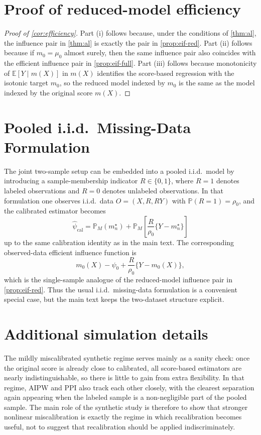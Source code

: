 \documentclass{article}
\theoremstyle{plain}
\theoremstyle{definition}
\newcommand{\E}{\mathbb{E}}
\newcommand{\Prob}{\mathbb{P}}
\newcommand{\1}{\mathbbm{1}}
\newcommand{\psihat}{\widehat{\psi}_{\mathrm{cal}}}
\newcommand{\rhozero}{\rho_0}
\newcommand{\mtilde}{m_n^\star}
\newcommand{\muzero}{\mu_0}
\begin{document}
\section{Proof of reduced-model efficiency}
\label{app:eff}

\begin{proof}[Proof of \cref{cor:efficiency}]
Part (i) follows because, under the conditions of \cref{thm:al}, the influence pair in \cref{thm:al} is exactly the pair in \cref{prop:eif-red}. Part (ii) follows because if \(m_0=\muzero\) almost surely, then the same influence pair also coincides with the efficient influence pair in \cref{prop:eif-full}. Part (iii) follows because monotonicity of \(\E[Y\mid m(X)]\) in \(m(X)\) identifies the score-based regression with the isotonic target \(m_0\), so the reduced model indexed by \(m_0\) is the same as the model indexed by the original score \(m(X)\).
\end{proof}
 

\section{Pooled i.i.d.\ Missing-Data Formulation}
\label{app:iid}

The joint two-sample setup can be embedded into a pooled i.i.d.\ model by introducing a sample-membership indicator \(R \in \{0,1\}\), where \(R=1\) denotes labeled observations and \(R=0\) denotes unlabeled observations. In that formulation one observes i.i.d.\ data \(O=(X,R,RY)\) with \(\Prob(R=1)=\rhozero\), and the calibrated estimator becomes
\[
\psihat = \mathbb P_M(\mtilde) + \mathbb P_M\left[\frac{R}{\rhozero}\{Y-\mtilde\}\right]
\]
up to the same calibration identity as in the main text. The corresponding observed-data efficient influence function is
\[
m_0(X)-\psi_0+\frac{R}{\rhozero}\{Y-m_0(X)\},
\]
which is the single-sample analogue of the reduced-model influence pair in \cref{prop:eif-red}. Thus the usual i.i.d.\ missing-data formulation is a convenient special case, but the main text keeps the two-dataset structure explicit.

 

\section{Additional simulation details}
\label{app:simulation-extra}
The mildly miscalibrated synthetic regime serves mainly as a sanity check: once the original score is already close to calibrated, all score-based estimators are nearly indistinguishable, so there is little to gain from extra flexibility. In that regime, AIPW and PPI also track each other closely, with the clearest separation again appearing when the labeled sample is a non-negligible part of the pooled sample. The main role of the synthetic study is therefore to show that stronger nonlinear miscalibration is exactly the regime in which recalibration becomes useful, not to suggest that recalibration should be applied indiscriminately.
\end{document}
